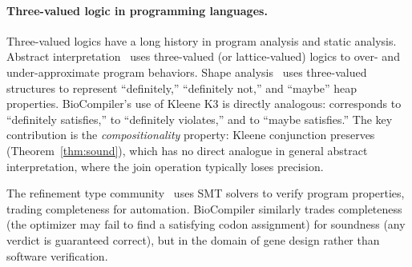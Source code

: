 \paragraph{Three-valued logic in programming languages.}
Three-valued logics have a long history in program analysis and static
analysis.  Abstract interpretation~\cite{cousot1977abstract} uses
three-valued (or lattice-valued) logics to over- and under-approximate
program behaviors.  Shape analysis~\cite{sagiv2002shape} uses
three-valued structures to represent ``definitely,'' ``definitely not,''
and ``maybe'' heap properties.  BioCompiler's use of Kleene K3 is
directly analogous: \PASS{} corresponds to ``definitely satisfies,''
\FAIL{} to ``definitely violates,'' and \UNCERTAIN{} to ``maybe
satisfies.''  The key contribution is the \emph{compositionality}
property: Kleene conjunction preserves \PASS{} (Theorem~\ref{thm:sound}),
which has no direct analogue in general abstract interpretation, where
the join operation typically loses precision.

The refinement type community~\cite{rondon2008liquid} uses SMT solvers
to verify program properties, trading completeness for automation.
BioCompiler similarly trades completeness (the optimizer may fail to find
a satisfying codon assignment) for soundness (any \PASS{} verdict is
guaranteed correct), but in the domain of gene design rather than
software verification.
